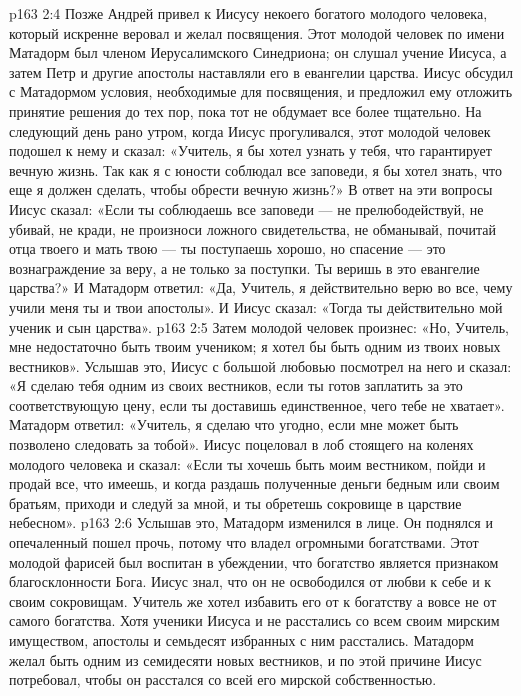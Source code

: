 \vs p163 2:4 \pc Позже Андрей привел к Иисусу некоего богатого молодого человека, который искренне веровал и желал посвящения. Этот молодой человек по имени Матадорм был членом Иерусалимского Синедриона; он слушал учение Иисуса, а затем Петр и другие апостолы наставляли его в евангелии царства. Иисус обсудил с Матадормом условия, необходимые для посвящения, и предложил ему отложить принятие решения до тех пор, пока тот не обдумает все более тщательно. На следующий день рано утром, когда Иисус прогуливался, этот молодой человек подошел к нему и сказал: «Учитель, я бы хотел узнать у тебя, что гарантирует вечную жизнь. Так как я с юности соблюдал все заповеди, я бы хотел знать, что еще я должен сделать, чтобы обрести вечную жизнь?» В ответ на эти вопросы Иисус сказал: «Если ты соблюдаешь все заповеди --- не прелюбодействуй, не убивай, не кради, не произноси ложного свидетельства, не обманывай, почитай отца твоего и мать твою --- ты поступаешь хорошо, но спасение --- это вознаграждение за веру, а не только за поступки. Ты веришь в это евангелие царства?» И Матадорм ответил: «Да, Учитель, я действительно верю во все, чему учили меня ты и твои апостолы». И Иисус сказал: «Тогда ты действительно мой ученик и сын царства».
\vs p163 2:5 Затем молодой человек произнес: «Но, Учитель, мне недостаточно быть твоим учеником; я хотел бы быть одним из твоих новых вестников». Услышав это, Иисус с большой любовью посмотрел на него и сказал: «Я сделаю тебя одним из своих вестников, если ты готов заплатить за это соответствующую цену, если ты доставишь единственное, чего тебе не хватает». Матадорм ответил: «Учитель, я сделаю что угодно, если мне может быть позволено следовать за тобой». Иисус поцеловал в лоб стоящего на коленях молодого человека и сказал: «Если ты хочешь быть моим вестником, пойди и продай все, что имеешь, и когда раздашь полученные деньги бедным или своим братьям, приходи и следуй за мной, и ты обретешь сокровище в царствие небесном».
\vs p163 2:6 Услышав это, Матадорм изменился в лице. Он поднялся и опечаленный пошел прочь, потому что владел огромными богатствами. Этот молодой фарисей был воспитан в убеждении, что богатство является признаком благосклонности Бога. Иисус знал, что он не освободился от любви к себе и к своим сокровищам. Учитель же хотел избавить его от  к богатству а вовсе не от самого богатства. Хотя ученики Иисуса и не расстались со всем своим мирским имуществом, апостолы и семьдесят избранных с ним расстались. Матадорм желал быть одним из семидесяти новых вестников, и по этой причине Иисус потребовал, чтобы он расстался со всей его мирской собственностью.
